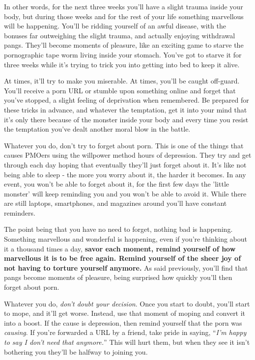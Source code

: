 \documentclass[
]{book}
\begin{document}
In other words, for the next three weeks you'll have a slight trauma inside your body, but during those weeks and for the rest of your life something marvellous will be happening. You'll be ridding yourself of an awful disease, with the bonuses far outweighing the slight trauma, and actually enjoying withdrawal pangs. They'll become moments of pleasure, like an exciting game to starve the pornographic tape worm living inside your stomach. You've got to starve it for three weeks while it's trying to trick you into getting into bed to keep it alive.

At times, it'll try to make you miserable. At times, you'll be caught off-guard. You'll receive a porn URL or stumble upon something online and forget that you've stopped, a slight feeling of deprivation when remembered. Be prepared for these tricks in advance, and whatever the temptation, get it into your mind that it's only there because of the monster inside your body and every time you resist the temptation you've dealt another moral blow in the battle.

Whatever you do, don't try to forget about porn. This is one of the things that causes PMOers using the willpower method hours of depression. They try and get through each day hoping that eventually they'll just forget about it. It's like not being able to sleep - the more you worry about it, the harder it becomes. In any event, you won't be able to forget about it, for the first few days the 'little monster' will keep reminding you and you won't be able to avoid it. While there are still laptops, smartphones, and magazines around you'll have constant reminders.

The point being that you have no need to forget, nothing bad is happening. Something marvellous and wonderful is happening, even if you're thinking about it a thousand times a day, \textbf{savor each moment, remind yourself of how marvellous it is to be free again. Remind yourself of the sheer joy of not having to torture yourself anymore.} As said previously, you'll find that pangs become moments of pleasure, being surprised how quickly you'll then forget about porn.

Whatever you do, \emph{don't doubt your decision}. Once you start to doubt, you'll start to mope, and it'll get worse. Instead, use that moment of moping and convert it into a boost. If the cause is depression, then remind yourself that the porn was \emph{causing}. If you're forwarded a URL by a friend, take pride in saying, ``\emph{I'm happy to say I don't need that anymore.}'' This will hurt them, but when they see it isn't bothering you they'll be halfway to joining you.
\end{document}
